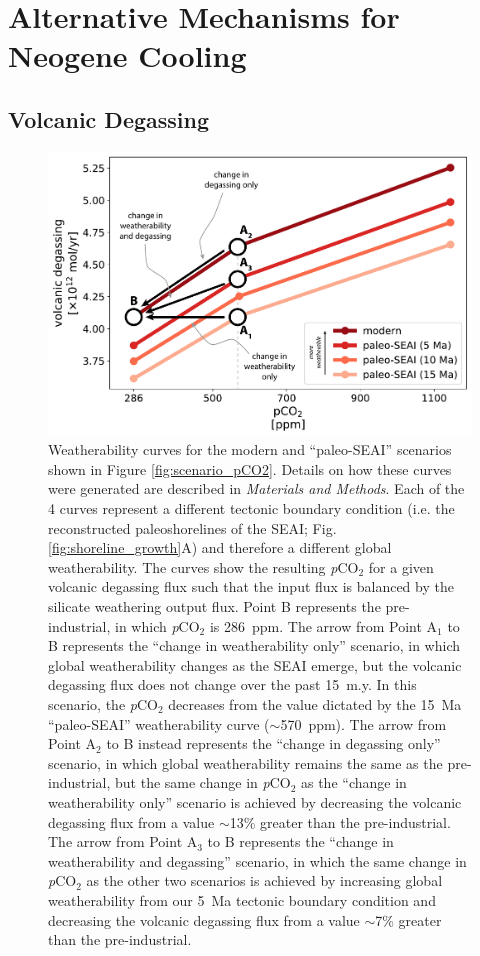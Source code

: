 \documentclass[9pt,twocolumn,twoside,lineno]{pnas-new}
\newcommand{\pCOtwo}{\textit{p}CO$_{2}$\xspace}
\newcommand{\MM}{\textit{Materials and Methods}\xspace}
\begin{document}
\section*{Alternative Mechanisms for Neogene Cooling}

\subsection*{Volcanic Degassing}

\begin{figure}[h]
    \centering
    \includegraphics[width=1\linewidth]{Manuscript/Figures/weatherability_curves.pdf}
    \caption{Weatherability curves for the modern and ``paleo-SEAI'' scenarios shown in Figure \ref{fig:scenario_pCO2}. Details on how these curves were generated are described in \MM. Each of the 4 curves represent a different tectonic boundary condition (i.e. the reconstructed paleoshorelines of the SEAI; Fig. \ref{fig:shoreline_growth}A) and therefore a different global weatherability. The curves show the resulting \pCOtwo for a given volcanic degassing flux such that the input flux is balanced by the silicate weathering output flux. Point B represents the pre-industrial, in which \pCOtwo is 286~ppm. The arrow from Point A$_{1}$ to B represents the ``change in weatherability only'' scenario, in which global weatherability changes as the SEAI emerge, but the volcanic degassing flux does not change over the past 15~m.y. In this scenario, the \pCOtwo decreases from the value dictated by the 15~Ma ``paleo-SEAI'' weatherability curve ($\sim$570~ppm). The arrow from Point A$_{2}$ to B instead represents the ``change in degassing only'' scenario, in which global weatherability remains the same as the pre-industrial, but the same change in \pCOtwo as the ``change in weatherability only'' scenario is achieved by decreasing the volcanic degassing flux from a value $\sim$13\% greater than the pre-industrial. The arrow from Point A$_{3}$ to B represents the ``change in weatherability and degassing'' scenario, in which the same change in \pCOtwo as the other two scenarios is achieved by increasing global weatherability from our 5~Ma tectonic boundary condition and decreasing the volcanic degassing flux from a value $\sim$7\% greater than the pre-industrial.}
    \label{fig:weatherability_curves}
\end{figure}
\end{document}
